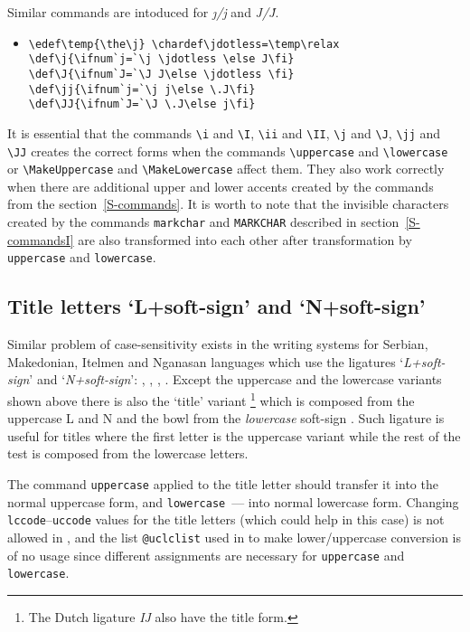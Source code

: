 Similar commands are intoduced for  {\sl \j/j} and {\sl J/\.J}.
\begin{itemize}\item[]\begin{verbatim}
\edef\temp{\the\j} \chardef\jdotless=\temp\relax
\def\j{\ifnum`j=`\j \jdotless \else J\fi}
\def\J{\ifnum`J=`\J J\else \jdotless \fi}
\def\jj{\ifnum`j=`\j j\else \.J\fi}
\def\JJ{\ifnum`J=`\J \.J\else j\fi}
\end{verbatim}\end{itemize}

It is essential that the commands \verb?\i? and \verb?\I?,
\verb?\ii? and \verb?\II?, \verb?\j? and \verb?\J?,
\verb?\jj? and \verb?\JJ? creates the correct forms
when the commands \verb?\uppercase? and \verb?\lowercase?
or \verb?\MakeUppercase? and \verb?\MakeLowercase?
affect them. They also work correctly when there are
additional upper and lower accents created by the commands from
the section~\ref{S-commands}. It is worth to note that
the invisible characters created by the commands {\tt\bs{}markchar}
and {\tt\bs{}MARKCHAR} described in section~\ref{S-commandsI}
are also transformed into each other
after transformation by {\tt\bs{}uppercase}
and {\tt\bs{}lowercase}.

\subsection{Title letters `L+soft-sign' and `N+soft-sign'\label{S-title}}

Similar problem of case-sensitivity exists
in the writing systems for Serbian, Makedonian,
Itelmen and Nganasan languages which use the ligatures
`{\sl L+soft-sign}' and `{\sl N+soft-sign}':
{\cyrfont {}}, {\cyrfont {}},
{\cyrfont {}}, {\cyrfont {}}.
Except the uppercase and the lowercase variants shown above
there is also the `title' variant%
     \footnote{The Dutch ligature {\sl IJ}
               also have the title form.}
which is composed from the uppercase {\cyrfont L} and {\cyrfont N}
and the bowl from the {\em lowercase} soft-sign {\cyrfont {}}.
Such ligature is useful for titles where the first letter is the
uppercase variant while the rest of the test is composed from
the lowercase letters.

The command {\tt\bs{}uppercase} applied to the title letter
should transfer it into the normal uppercase form,
and {\tt\bs{}lowercase}~--- into normal lowercase form.
Changing {\tt\bs{}lccode}--{\tt\bs{}uccode} values
for the title letters (which could help in this case)
is not allowed in \LaTeXe{}, and
the list {\tt\bs{}@uclclist} used in \LaTeXe{}
to make lower/uppercase conversion is of no
usage since different assignments are necessary
for {\tt\bs{}uppercase} and {\tt\bs{}lowercase}.

